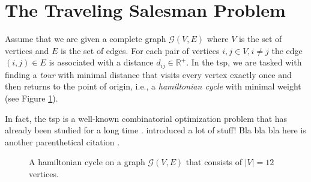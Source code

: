 \section{The Traveling Salesman Problem}
\label{section:tsp}
Assume that we are given a complete graph $\mathcal{G}(V,E)$ where $V$ is the set of vertices and $E$ is the set of edges.
For each pair of vertices $i, j \in V, i \neq j$ the edge $(i,j) \in E$ is associated with a distance $d_{ij} \in \mathbb{R}^+$.
In the \ac{tsp}, we are tasked with finding a \textit{tour} with minimal distance that visits every vertex exactly once and then returns to the point of origin, i.e., a \textit{hamiltonian cycle} with minimal weight (see Figure \ref{fig:figure1}).

In fact, the \ac{tsp} is a well-known combinatorial optimization problem that has already been studied for a long time \parencite[see, e.g.,][]{lin1965computer,dantzig1954solution}.
\textcite{dantzig1954solution} introduced a lot of stuff! Bla bla bla here is another parenthetical citation \parencite{lin1965computer}.

\begin{figure}[h]
  \centering
  \caption{A hamiltonian cycle on a graph $\mathcal{G}(V,E)$ that consists of $\vert V \vert = 12$ vertices.}
  \label{fig:figure1}
\end{figure}